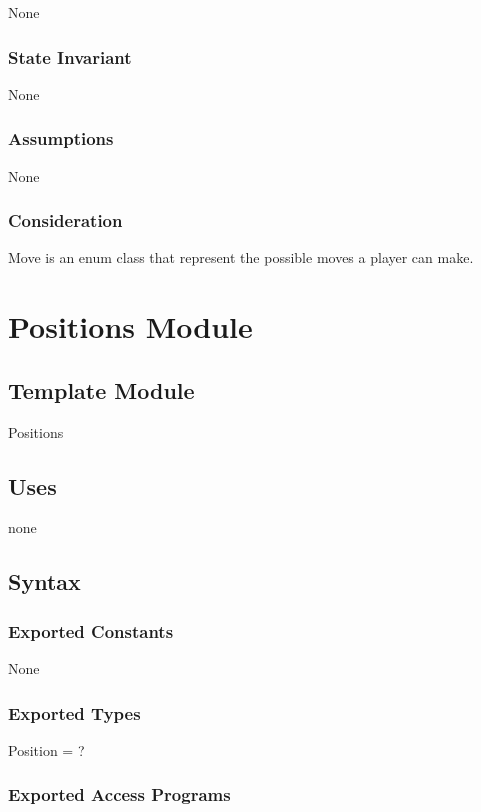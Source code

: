 \documentclass[12pt]{article}
\begin{document}
None

\subsubsection* {State Invariant}

None

\subsubsection* {Assumptions}

None

\subsubsection* {Consideration}

Move is an enum class that represent the possible moves a player can make.

\newpage

\section* {Positions Module}

\subsection*{Template Module}

Positions

\subsection* {Uses}

none

\subsection* {Syntax}

\subsubsection* {Exported Constants}

None

\subsubsection* {Exported Types}

Position = ?

\subsubsection* {Exported Access Programs}
\end{document}

